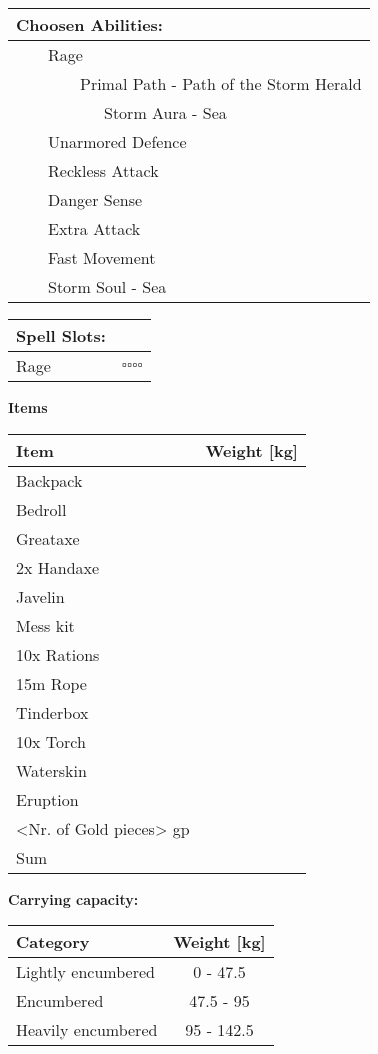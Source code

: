 \documentclass[11pt]{article}
\newcommand{\available}{$\square$}
\newcommand{\tabitem}{~~\llap{--}~~}
\newcommand{\tabtabitem}{~~~~~~\llap{$\bullet$}~~}
\newcommand{\tabtabtabitem}{~~~~~~~~~\llap{$\star$}~~}
\begin{document}
\begin{multicols}{2}
\vspace{4mm}

\noindent \begin{tabularx}{95mm}{@{}l}
{\Large \textbf{Choosen Abilities:}} \\
\hline
\tabitem Rage \\
\tabtabitem Primal Path - Path of the Storm Herald \\
\tabtabtabitem Storm Aura - Sea \\
\tabitem Unarmored Defence \\
\tabitem Reckless Attack \\
\tabitem Danger Sense \\
\tabitem Extra Attack \\
\tabitem Fast Movement \\
\tabitem Storm Soul - Sea
		\end{tabularx}

\vspace{4mm}

\noindent \begin{tabularx}{95mm}{@{}l c}
{\Large \textbf{Spell Slots:}} & \\
\hline
Rage	& \available \available \available \available
		\end{tabularx}
	\end{multicols}

\clearpage

	\begin{center}
{\LARGE \textbf{Items}}
	\end{center}

	\begin{tabularx}{\textwidth}{X|r}
Item & Weight [kg] \\
\hline
Backpack									&			\\
Bedroll										&			\\
Greataxe									&			\\
2x Handaxe									&			\\
Javelin										&			\\
Mess kit									&			\\
10x Rations									&			\\
15m Rope									&			\\
Tinderbox									&			\\
10x Torch									&			\\
Waterskin									&			\\
Eruption									&			\\
<Nr. of Gold pieces> gp 					& 			\\
\hline
Sum 										& 			\\
	\end{tabularx}

\vspace{10mm}

\textbf{Carrying capacity:} \\

	\begin{tabular}{l|c}
Category & Weight [kg] \\
\hline
Lightly encumbered 	& 0 - 47.5 	\\
Encumbered 			& 47.5 - 95 \\
Heavily encumbered	& 95 - 142.5 \\
	\end{tabular}
\end{document}
